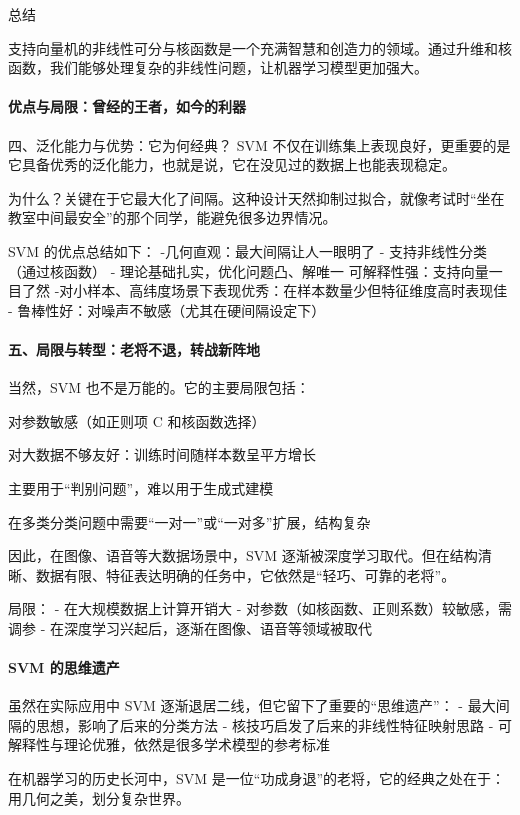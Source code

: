 { 总结

支持向量机的非线性可分与核函数是一个充满智慧和创造力的领域。通过升维和核函数，我们能够处理复杂的非线性问题，让机器学习模型更加强大。

\paragraph*{优点与局限：曾经的王者，如今的利器}
{四、泛化能力与优势：它为何经典？}
SVM 不仅在训练集上表现良好，更重要的是它具备优秀的泛化能力，也就是说，它在没见过的数据上也能表现稳定。

为什么？关键在于它最大化了间隔。这种设计天然抑制过拟合，就像考试时“坐在教室中间最安全”的那个同学，能避免很多边界情况。

SVM 的优点总结如下：
-几何直观：最大间隔让人一眼明了
- 支持非线性分类（通过核函数）
- 理论基础扎实，优化问题凸、解唯一
可解释性强：支持向量一目了然
-对小样本、高纬度场景下表现优秀：在样本数量少但特征维度高时表现佳
- 鲁棒性好：对噪声不敏感（尤其在硬间隔设定下）


\paragraph*{五、局限与转型：老将不退，转战新阵地}
当然，SVM 也不是万能的。它的主要局限包括：

对参数敏感（如正则项 C 和核函数选择）

对大数据不够友好：训练时间随样本数呈平方增长

主要用于“判别问题”，难以用于生成式建模

在多类分类问题中需要“一对一”或“一对多”扩展，结构复杂

因此，在图像、语音等大数据场景中，SVM 逐渐被深度学习取代。但在结构清晰、数据有限、特征表达明确的任务中，它依然是“轻巧、可靠的老将”。

局限：
- 在大规模数据上计算开销大
- 对参数（如核函数、正则系数）较敏感，需调参
- 在深度学习兴起后，逐渐在图像、语音等领域被取代

\paragraph*{SVM 的思维遗产}

虽然在实际应用中 SVM 逐渐退居二线，但它留下了重要的“思维遗产”：
- 最大间隔的思想，影响了后来的分类方法
- 核技巧启发了后来的非线性特征映射思路
- 可解释性与理论优雅，依然是很多学术模型的参考标准

 在机器学习的历史长河中，SVM 是一位“功成身退”的老将，它的经典之处在于：用几何之美，划分复杂世界。

}
